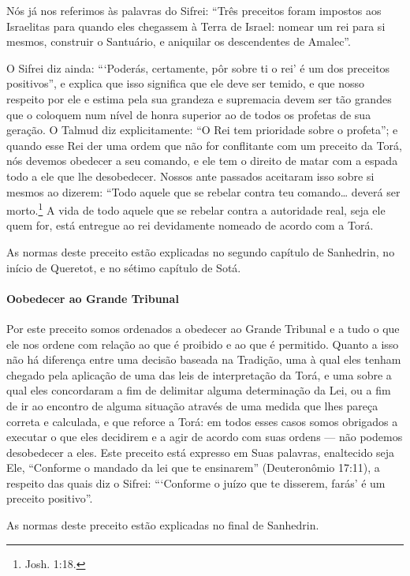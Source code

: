 Nós já nos referimos às palavras do Sifrei: ``Três preceitos foram
impostos aos Israelitas para quando eles chegassem à Terra de Israel:
nomear um rei para si mesmos, construir o Santuário, e aniquilar os
descendentes de Amalec''.

O Sifrei diz ainda: ```Poderás, certamente, pôr sobre ti o rei' é um dos
preceitos positivos'', e explica que isso significa que ele deve ser
temido, e que nosso respeito por ele e estima pela sua grandeza e
supremacia devem ser tão grandes que o coloquem num nível de honra superior ao de todos
os profetas de sua geração. O Talmud diz explicitamente: ``O Rei tem
prioridade sobre o profeta''; e quando esse Rei der uma ordem que não for
conflitante com um preceito da Torá, nós devemos obedecer a seu comando, e ele tem
o direito de matar com a espada todo a ele que lhe desobedecer. Nossos
ante passados aceitaram isso sobre si mesmos ao dizerem: ``Todo aquele que se
rebelar contra teu comando\ldots{} deverá ser morto.\footnote{Josh. 1:18.} A vida de
todo aquele que se rebelar contra a autoridade real, seja ele quem for, está entregue ao rei devidamente nomeado de acordo com a Torá.

As normas deste preceito estão explicadas no segundo capítulo de
Sanhedrin, no início de Queretot, e no sétimo capítulo de Sotá.

\paragraph{Oobedecer ao Grande Tribunal}

Por este preceito somos ordenados a obedecer ao Grande Tribunal e a tudo
o que ele nos ordene com relação ao que é proibido e ao que é permitido. Quanto a isso não há diferença entre uma decisão baseada na
Tradição, uma à qual eles tenham chegado pela aplicação de uma das leis
de interpretação da Torá, e uma sobre a qual eles concordaram a fim de
delimitar alguma determinação da Lei, ou a fim de ir ao encontro de
alguma situação através de uma medida que lhes pareça correta e
calculada, e que reforce a Torá: em todos esses casos somos obrigados a
executar o que eles decidirem e a agir de acordo com suas ordens --- não
podemos desobedecer a eles. Este preceito está expresso em Suas
palavras, enaltecido seja Ele, ``Conforme o mandado da lei que te
ensinarem'' (Deuteronômio 17:11), a respeito das quais diz o Sifrei:
```Conforme o juízo que te disserem, farás' é um preceito positivo''.

As normas deste preceito estão explicadas no final de Sanhedrin.

